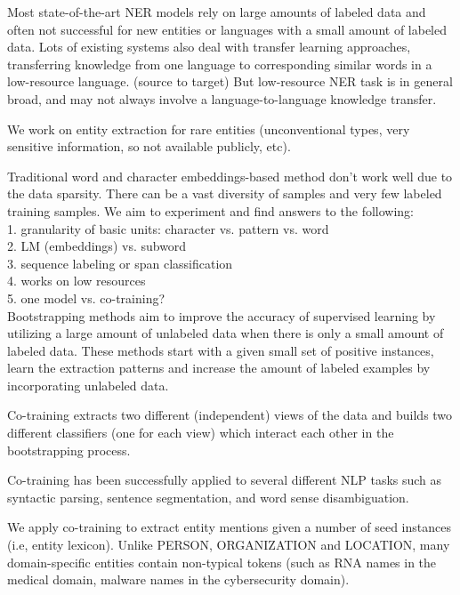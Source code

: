 Most state-of-the-art NER models rely on large amounts of labeled data and often not successful for new entities or languages with a small amount of labeled data.
Lots of existing systems also deal with transfer learning approaches, transferring knowledge from one language to corresponding similar words in a low-resource language. (source to target)
But low-resource NER task is in general broad, and may not always involve a language-to-language knowledge transfer.

We work on entity extraction for rare entities (unconventional types, very sensitive information, so not available publicly, etc).

Traditional word and character embeddings-based method don't work well due to the data sparsity.
There can be a vast diversity of samples and very few labeled training samples.
We aim to experiment and find answers to the following: \\
1. granularity of basic units: character vs. pattern vs. word \\
2. LM (embeddings) vs. subword \\
3. sequence labeling or span classification \\
4. works on low resources \\
5. one model vs. co-training? \\

Bootstrapping methods aim to improve the accuracy of supervised learning by utilizing a large amount of unlabeled data when there is only a small amount of labeled data.
These methods start with a given small set of positive instances, learn the extraction patterns and increase the amount of labeled examples by incorporating unlabeled data.

Co-training extracts two different (independent) views of the data and builds two different classifiers (one for each view) which interact each other in the bootstrapping process.

Co-training has been successfully applied to several different NLP tasks such as syntactic parsing, sentence segmentation, and word sense disambiguation.

We apply co-training to extract entity mentions given a number of seed instances (i.e, entity lexicon).
Unlike PERSON, ORGANIZATION and LOCATION, many domain-specific entities contain non-typical tokens (such as RNA names in the medical domain, malware names in the cybersecurity domain).
